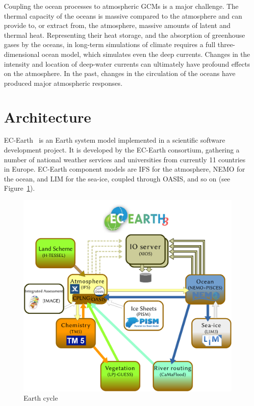 Coupling the ocean processes to atmospheric GCMs is a major challenge. The thermal capacity of the oceans is massive compared to 
the atmosphere and can provide to, or extract from, the atmosphere, massive amounts of latent and thermal heat. Representing their 
heat storage, and the absorption of greenhouse gases by the oceans, in long-term simulations of climate requires a full three-dimensional 
ocean model, which simulates even the deep currents. Changes in the intensity and location of deep-water currents can ultimately have 
profound effects on the atmosphere. In the past, changes in the circulation of the oceans have produced major atmospheric responses. 





\section{Architecture}
EC-Earth~\cite{Hazeleger2010,Hazeleger2012} is an Earth system model implemented in a scientific software development project. %
It is developed by the EC-Earth consortium, gathering a number of national weather services 
and universities from currently 11 countries in Europe. EC-Earth component models are IFS for the atmosphere, 
NEMO for the ocean, and LIM for the sea-ice, coupled through OASIS, and so on (see Figure~\ref{fig:ecearth}). 



\begin{figure}[h!]
    \centering
    \includegraphics[scale=0.5]{figs/cw2015-ec-earth}
    \caption{Earth cycle} %
    \label{fig:ecearth}
\end{figure}

